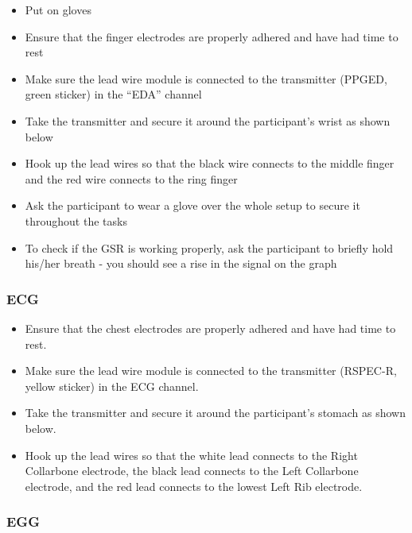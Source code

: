 \documentclass[]{book}
\providecommand{\tightlist}{%
  \setlength{\itemsep}{0pt}\setlength{\parskip}{0pt}}
\begin{document}
\begin{itemize}
\tightlist
\item
  Put on gloves
\item
  Ensure that the finger electrodes are properly adhered and have had time to rest
\item
  Make sure the lead wire module is connected to the transmitter (PPGED, green sticker) in the ``EDA'' channel
\item
  Take the transmitter and secure it around the participant's wrist as shown below
\item
  Hook up the lead wires so that the black wire connects to the middle finger and the red wire connects to the ring finger
\item
  Ask the participant to wear a glove over the whole setup to secure it throughout the tasks
\item
  To check if the GSR is working properly, ask the participant to briefly hold his/her breath - you should see a rise in the signal on the graph
\end{itemize}

\hypertarget{ecg}{%
\subsubsection{ECG}\label{ecg}}

\begin{itemize}
\tightlist
\item
  Ensure that the chest electrodes are properly adhered and have had time to rest.
\item
  Make sure the lead wire module is connected to the transmitter (RSPEC-R, yellow sticker) in the ECG channel.
\item
  Take the transmitter and secure it around the participant's stomach as shown below.
\item
  Hook up the lead wires so that the white lead connects to the Right Collarbone electrode, the black lead connects to the Left Collarbone electrode, and the red lead connects to the lowest Left Rib electrode.
\end{itemize}

\hypertarget{egg}{%
\subsubsection{EGG}\label{egg}}
\end{document}
